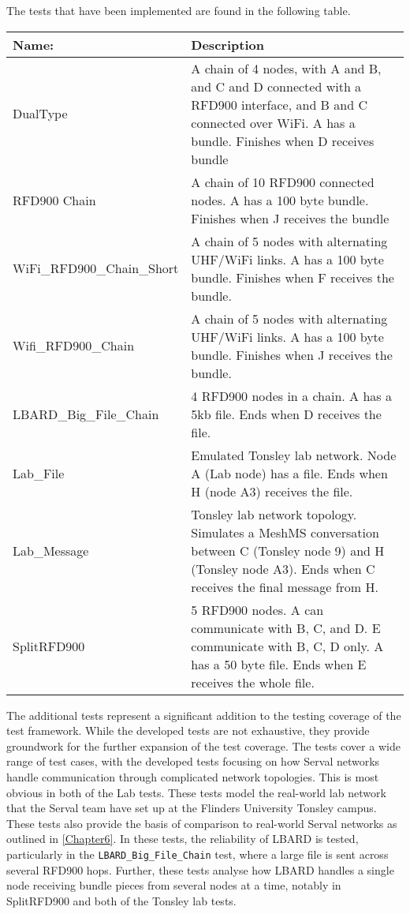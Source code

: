 The tests that have been implemented are found in the following table.
\begin{table}[h!]
    \centering
    \begin{tabularx}{\textwidth}{l|X}
        \textbf{Name:}  &  \textbf{Description} \\ \hline
        DualType            &   A chain of 4 nodes, with A and B, and C and D connected with a RFD900 interface, and B and C connected over WiFi. A has a bundle. Finishes when D receives bundle \\ \hline
        RFD900 Chain    &   A chain of 10 RFD900 connected nodes. A has a 100 byte bundle. Finishes when J receives the bundle   \\ \hline
        WiFi\_RFD900\_Chain\_Short & A chain of 5 nodes with alternating UHF/WiFi links. A has a 100 byte bundle. Finishes when F receives the bundle. \\ \hline
        Wifi\_RFD900\_Chain & A chain of 5 nodes with alternating UHF/WiFi links. A has a 100 byte bundle. Finishes when J receives the bundle.     \\ \hline
        LBARD\_Big\_File\_Chain & 4 RFD900 nodes in a chain. A has a 5kb file. Ends when D receives the file.  \\ \hline
        Lab\_File   & Emulated Tonsley lab network. Node A (Lab node) has a file. Ends when H (node A3) receives the file.  \\ \hline
        Lab\_Message& Tonsley lab network topology. Simulates a MeshMS conversation between C (Tonsley node 9) and H (Tonsley node A3). Ends when C receives the final message from H.   \\ \hline
        SplitRFD900 & 5 RFD900 nodes. A can communicate with B, C, and D. E communicate with B, C, D only. A has a 50 byte file. Ends when E receives the whole file. \\ \hline        
    \end{tabularx}
\end{table}

\pagebreak


The additional tests represent a significant addition to the testing coverage of the test framework.
While the developed tests are not exhaustive, they provide groundwork for the further expansion of the test coverage.
The tests cover a wide range of test cases, with the developed tests focusing on how Serval networks handle communication through complicated network topologies.
This is most obvious in both of the Lab tests. These tests model the real-world lab network that the Serval team have set up at the Flinders University Tonsley campus.
These tests also provide the basis of comparison to real-world Serval networks as outlined in \chaptername{ \ref{Chapter6}}.
In these tests, the reliability of LBARD is tested, particularly in the \texttt{LBARD\_Big\_File\_Chain} test, where a large file is sent across several RFD900 hops.
Further, these tests analyse how LBARD handles a single node receiving bundle pieces from several nodes at a time, notably in SplitRFD900 and both of the Tonsley lab tests.


